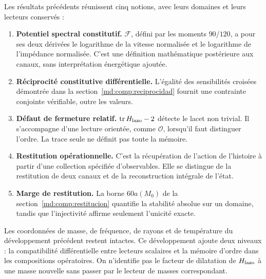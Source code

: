 Les résultats précédents réunissent cinq notions, avec leurs domaines
et leurs lecteurs conservés :
\begin{enumerate}
 \item \textbf{Potentiel spectral constitutif.}
 \(\mathscr F\), défini par les moments \(90/120\), a pour
 ses deux dérivées le logarithme de la vitesse normalisée et le
 logarithme de l’impédance normalisée. C’est une définition mathématique
 postérieure aux canaux, sans interprétation énergétique ajoutée.

 \item \textbf{Réciprocité constitutive différentielle.}
 L’égalité des sensibilités croisées démontrée dans la
 section~\ref{md:comp:reciprocidad} fournit une contrainte
 conjointe vérifiable, outre les valeurs.

 \item \textbf{Défaut de fermeture relatif.}
 \(\operatorname{tr}H_{\rm lazo}-2\) détecte le lacet non trivial.
 Il s’accompagne d’une lecture orientée, comme \(\mathcal O\), lorsqu’il
 faut distinguer l’ordre. La trace seule ne définit pas toute la mémoire.

 \item \textbf{Restitution opérationnelle.}
 C’est la récupération de l’action de l’histoire à partir d’une collection
 spécifiée d’observables. Elle se distingue de la restitution de deux
 canaux et de la reconstruction intégrale de l’état.

 \item \textbf{Marge de restitution.}
 La borne \(60a(M_0)\) de la section~\ref{md:comp:restitucion}
 quantifie la stabilité absolue sur un domaine, tandis que
 l’injectivité affirme seulement l’unicité exacte.
\end{enumerate}

Les coordonnées de masse, de fréquence, de rayons et de température du
développement précédent restent intactes. Ce développement ajoute
deux niveaux : la compatibilité différentielle entre lecteurs scalaires
et la mémoire d’ordre dans les compositions opératoires.
On n’identifie pas le facteur de dilatation de \(H_{\rm lazo}\) à
une masse nouvelle sans passer par le lecteur de masses correspondant.
